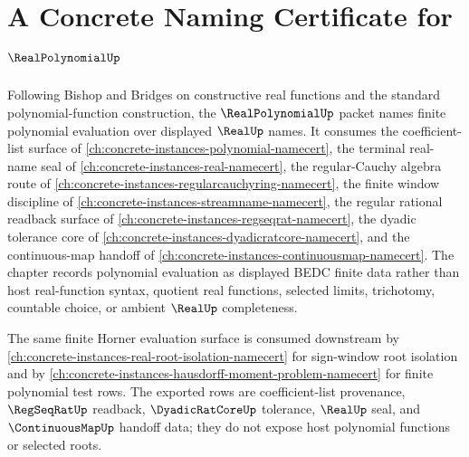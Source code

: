 \chapter{A Concrete Naming Certificate for $\RealPolynomialUp$}
\label{ch:concrete-instances-real-polynomial-namecert}

Following Bishop and Bridges on constructive real functions and the standard polynomial-function construction, the $\RealPolynomialUp$ packet names finite polynomial evaluation over displayed $\RealUp$ names. It consumes the coefficient-list surface of \autoref{ch:concrete-instances-polynomial-namecert}, the terminal real-name seal of \autoref{ch:concrete-instances-real-namecert}, the regular-Cauchy algebra route of \autoref{ch:concrete-instances-regularcauchyring-namecert}, the finite window discipline of \autoref{ch:concrete-instances-streamname-namecert}, the regular rational readback surface of \autoref{ch:concrete-instances-regseqrat-namecert}, the dyadic tolerance core of \autoref{ch:concrete-instances-dyadicratcore-namecert}, and the continuous-map handoff of \autoref{ch:concrete-instances-continuousmap-namecert}. The chapter records polynomial evaluation as displayed BEDC finite data rather than host real-function syntax, quotient real functions, selected limits, trichotomy, countable choice, or ambient $\RealUp$ completeness.

The same finite Horner evaluation surface is consumed downstream by \autoref{ch:concrete-instances-real-root-isolation-namecert} for sign-window root isolation and by \autoref{ch:concrete-instances-hausdorff-moment-problem-namecert} for finite polynomial test rows. The exported rows are coefficient-list provenance, $\RegSeqRatUp$ readback, $\DyadicRatCoreUp$ tolerance, $\RealUp$ seal, and $\ContinuousMapUp$ handoff data; they do not expose host polynomial functions or selected roots.

